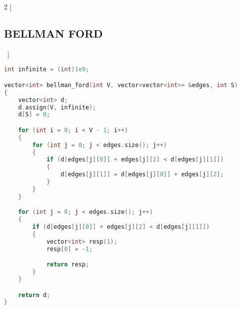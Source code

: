 \documentclass[leter]{amsart}
\begin{document}
\begin{multicols}{2}
[\subsection{BELLMAN FORD}\ ]
\begin{lstlisting}[language=C++]
int infinite = (int)1e9;

vector<int> bellman_ford(int V, vector<vector<int>> &edges, int S)
{
    vector<int> d;
    d.assign(V, infinite);
    d[S] = 0;

    for (int i = 0; i < V - 1; i++)
    {
        for (int j = 0; j < edges.size(); j++)
        {
            if (d[edges[j][0]] + edges[j][2] < d[edges[j][1]])
            {
                d[edges[j][1]] = d[edges[j][0]] + edges[j][2];
            }
        }
    }

    for (int j = 0; j < edges.size(); j++)
    {
        if (d[edges[j][0]] + edges[j][2] < d[edges[j][1]])
        {
            vector<int> resp(1);
            resp[0] = -1;

            return resp;
        }
    }

    return d;
}

\end{lstlisting}
\end{multicols}
\end{document}
